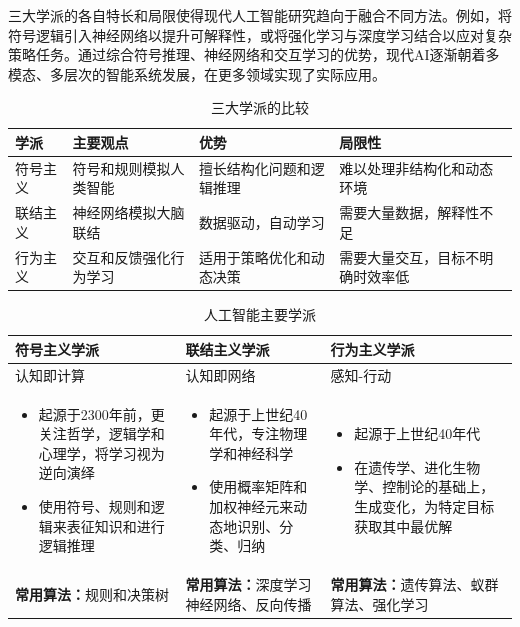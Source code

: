 三大学派的各自特长和局限使得现代人工智能研究趋向于融合不同方法。例如，将符号逻辑引入神经网络以提升可解释性，或将强化学习与深度学习结合以应对复杂策略任务。通过综合符号推理、神经网络和交互学习的优势，现代AI逐渐朝着多模态、多层次的智能系统发展，在更多领域实现了实际应用。

\begin{table}[htbp]
  \centering
  \caption{三大学派的比较}
  \begin{tabular}{|p{}|p{}|p{}|p{}|}
    \toprule
     \centering\textbf{学派}  & \centering\textbf{主要观点}  &\centering \textbf{优势 } &\textbf{ 局限性}   \\
    \midrule
  符号主义   &符号和规则模拟人类智能  &擅长结构化问题和逻辑推理   & 难以处理非结构化和动态环境   \\    \midrule 
   联结主义 & 神经网络模拟大脑联结    &  数据驱动，自动学习  & 需要大量数据，解释性不足   
    \\     \midrule
      行为主义  & 交互和反馈强化行为学习   & 适用于策略优化和动态决策    &  需要大量交互，目标不明确时效率低   \\
    \bottomrule
  \end{tabular}
\end{table}

\begin{table}[htbp]
  \centering
  \caption{人工智能主要学派}
  \begin{tabular}{|p{}|p{}|p{}|}
    \toprule
     \centering\textbf{符号主义学派}  & \centering\textbf{联结主义学派}  & \textbf{行为主义学派} \\
    \midrule
   认知即计算 &认知即网络 & 感知-行动  \\
    \begin{itemize}
\item 起源于2300年前，更关注哲学，逻辑学和心理学，将学习视为逆向演绎
\item 使用符号、规则和逻辑来表征知识和进行逻辑推理
\end{itemize}
 & 
  \begin{itemize}
\item 起源于上世纪40年代，专注物理学和神经科学
\item 使用概率矩阵和加权神经元来动态地识别、分类、归纳
\end{itemize}
&\begin{itemize}
\item 起源于上世纪40年代
\item 在遗传学、进化生物学、控制论的基础上，生成变化，为特定目标获取其中最优解
\end{itemize}
    \\
      {\bf 常用算法：}规则和决策树
 &  {\bf 常用算法：}深度学习神经网络、反向传播 &   {\bf 常用算法：}遗传算法、蚁群算法、强化学习  \\
    \bottomrule
  \end{tabular}
\end{table}

